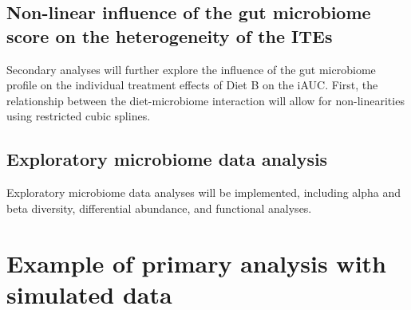 \documentclass[12pt]{article}
\begin{document}
\subsection{Non-linear influence of the gut microbiome score on the heterogeneity of the ITEs}
Secondary analyses will further explore the influence of the gut microbiome profile on the individual treatment effects of Diet B on the iAUC. First, the relationship between the diet-microbiome interaction will allow for non-linearities using restricted cubic splines.
\subsection{Exploratory microbiome data analysis}
Exploratory microbiome data analyses will be implemented, including alpha and beta diversity, differential abundance, and functional analyses.
\newpage
\section{Example of primary analysis with simulated data}
\end{document}
